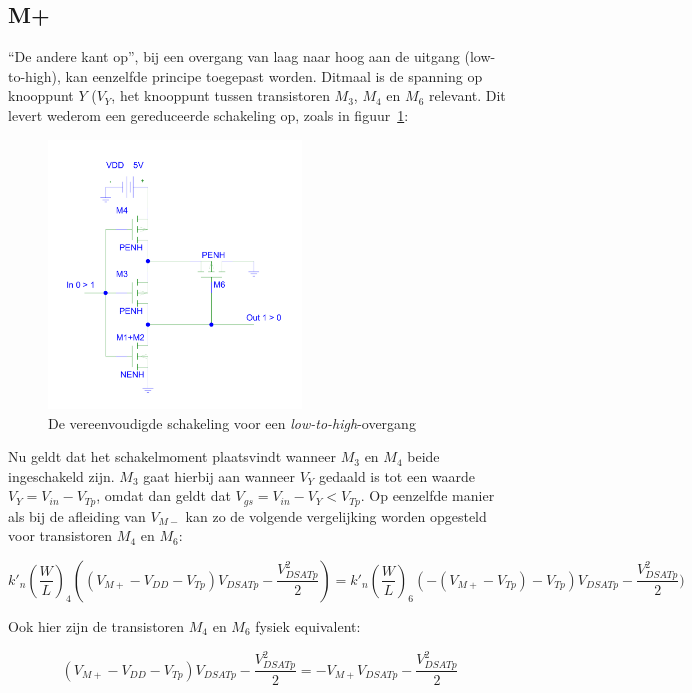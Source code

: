 \documentclass{scrartcl}  %
\begin{document}
\subsection{M+}
\label{subsec:trig-methode-mplus}
``De andere kant op'', bij een overgang van laag naar hoog aan de uitgang (low-to-high), kan eenzelfde principe toegepast worden. Ditmaal is de spanning op knooppunt $Y$ ($V_{Y}$, het knooppunt tussen transistoren $M_{3}$, $M_{4}$ en $M_{6}$ relevant. Dit levert wederom een gereduceerde schakeling op, zoals in figuur~\ref{fig:schmitt-schem-low-to-high}:

\begin{figure}[H]
\centering
	\includegraphics[width=0.6\textwidth]{resource/schmitt-low-to-high-rc.pdf}
	\caption{De vereenvoudigde schakeling voor een \textit{low-to-high}-overgang}
	\label{fig:schmitt-schem-low-to-high}
\end{figure}

Nu geldt dat het schakelmoment plaatsvindt wanneer $M_{3}$ en $M_{4}$ beide ingeschakeld zijn. $M_{3}$ gaat hierbij aan wanneer $V_{Y}$ gedaald is tot een waarde $V_{Y} = V_{in} - V_{Tp}$, omdat dan geldt dat $V_{gs} = V_{in} - V_{Y} < V_{Tp}$. Op eenzelfde manier als bij de afleiding van $V_{M-}$ kan zo de volgende vergelijking worden opgesteld voor transistoren $M_{4}$ en $M_{6}$:

$$k'_{n}(\frac{W}{L})_{4}((V_{M+}-V_{DD}-V_{Tp})V_{DSATp} - \frac{V^{2}_{DSATp}}{2}) = k'_{n}(\frac{W}{L})_{6}(-(V_{M+}-V_{Tp})-V_{Tp})V_{DSATp} - \frac{V^{2}_{DSATp}}{2})$$

Ook hier zijn de transistoren $M_{4}$ en $M_{6}$ fysiek equivalent:

$$(V_{M+}-V_{DD}-V_{Tp})V_{DSATp} - \frac{V^{2}_{DSATp}}{2} = -V_{M+}V_{DSATp} - \frac{V^{2}_{DSATp}}{2}$$
\end{document}
